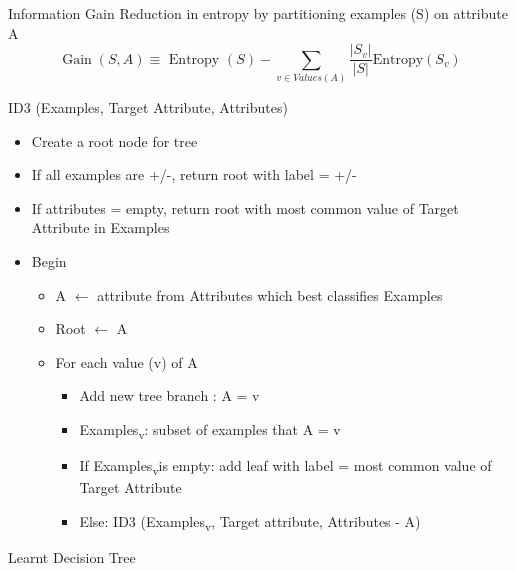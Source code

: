 \documentclass[usenames,dvipsnames]{beamer}
\begin{document}
\begin{frame}{Information Gain}
 Reduction in entropy
by partitioning examples (S) on attribute A
$$
\operatorname{Gain}(S, A) \equiv \text { Entropy }(S)-\sum_{v \in V a l u e s(A)} \frac{\left|S_{v}\right|}{|S|} \text {Entropy}\left(S_{v}\right)
$$
\end{frame}


\begin{frame}{ID3 (Examples, Target Attribute, Attributes)}
\begin{itemize}[<+->]
	\item Create a root node for tree
	\item If all examples are +/-, return root with label = +/-
	\item  If attributes = empty, return root with most common value of
	Target Attribute in Examples
	\item Begin
	\begin{itemize}[<+->]
		\item A $\leftarrow$ attribute from Attributes which best classifies
		Examples
		\item 	Root $\leftarrow$ A
		\item  For each value (v) of A
		\begin{itemize}[<+->]
			\item Add new tree branch : A = v
			\item  Examples\textsubscript{v}: subset of examples that A = v
			\item If Examples\textsubscript{v}is empty: add leaf with label = most
			common value of Target Attribute
			\item Else: ID3 (Examples\textsubscript{v}, Target attribute, Attributes - {A})
		\end{itemize}
	\end{itemize}


\end{itemize}
\end{frame}

\begin{frame}{Learnt Decision Tree}

\end{frame}
\end{document}
